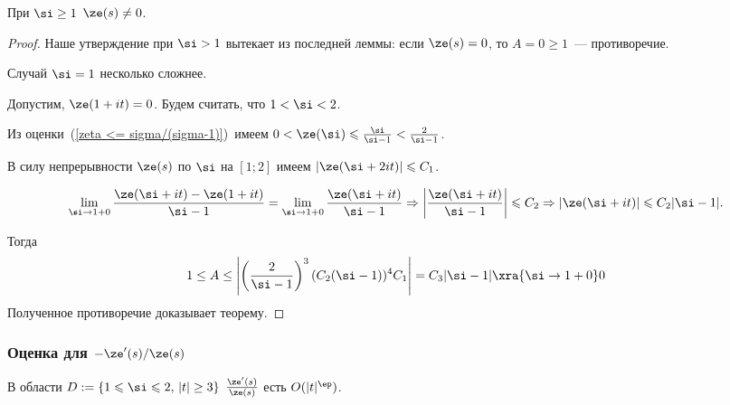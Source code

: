 \begin{theorem}
  При $\si\ge1$ $\ze(s)\neq0$.
\end{theorem}
\begin{proof}
  Наше утверждение при $\si>1$ вытекает из последней леммы: если $\ze(s)=0$, то $A=0\ge1$~— противоречие.

  Случай $\si=1$ несколько сложнее.

  Допустим, $\ze(1+it)=0$. Будем считать, что $1<\si<2$.

   Из оценки~(\ref{zeta <= sigma/(sigma-1)})~имеем $0<\ze(\si)\leqslant\frac{\si}{\si-1}<\frac2{\si-1}$.

   В силу непрерывности $\ze(s)$ по $\si$ на $[1;2]$ имеем $|\ze(\si+2it)|\leqslant C_1$.


  $$
    \limlim_{\si\to1+0}\frac{\ze(\si+it)-\ze(1+it)}{\si-1} = \limlim_{\si\to1+0}\frac{\ze(\si+it)}{\si-1} \Rightarrow
    \left|\frac{\ze(\si+it)}{\si-1}\right|\leqslant C_2 \Rightarrow
    |\ze(\si+it)|\leqslant C_2|\si-1|.
  $$

  Тогда
  $$
  1\le A\le\left|\left(\frac2{\si-1}\right)^3(C_2(\si-1))^4C_1\right|=C_3|\si-1|\xra{\si\to1+0}0
  $$
  Полученное противоречие доказывает теорему.
\end{proof}

\subsubsection{Оценка для $-\ze'(s)/\ze(s)$}

\begin{theorem}
  В области $D:=\{1\leqslant\si\leqslant2,\,|t|\ge3\}$ $\frac{\ze'(s)}{\ze(s)}$ есть $O(|t|^\ep)$.
\end{theorem}


